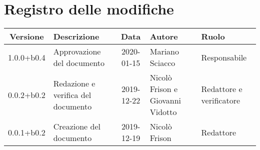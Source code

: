 \section*{Registro delle modifiche}

\begin{center}
	\begin{longtable}{|c|p{3.5cm}|c|p{3cm}|p{3cm}|}
		\hline
		\rowcolor{lighter-grayer}
		\textbf{Versione} & \textbf{Descrizione} & \textbf{Data} & \textbf{Autore} & \textbf{Ruolo} \\
		\hline
		\endfirsthead


	1.0.0+b0.4 & Approvazione del documento & 2020-01-15 & Mariano Sciacco & Responsabile \\
	\hline
	0.0.2+b0.2 & Redazione e verifica del documento & 2019-12-22 & Nicolò Frison e Giovanni Vidotto & Redattore e verificatore \\
	\hline
	0.0.1+b0.2 & Creazione del documento & 2019-12-19 & Nicolò Frison & Redattore \\
	\hline

	\end{longtable}
\end{center}